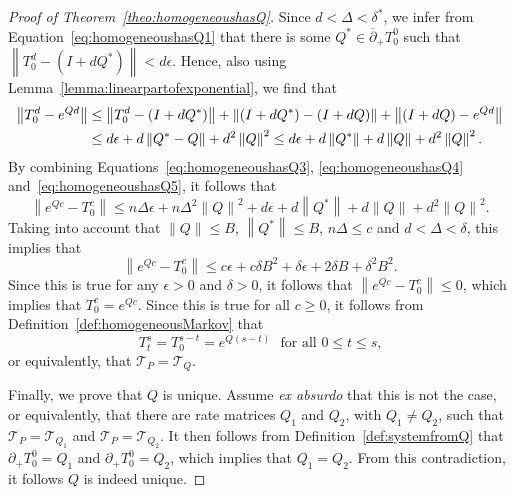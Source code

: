 \documentclass[10pt]{paper}
\theoremstyle{definition}
\newcommand{\norm}[1]{\left\lVert #1 \right\rVert}
\begin{document}
\begin{proof}[Proof of Theorem~\ref{theo:homogeneoushasQ}]
Since $d<\Delta<\delta^*$, we infer from Equation~\eqref{eq:homogeneoushasQ1} that there is some $Q^*\in\overline{\partial}_{+}
{T^0_{0}}$ such that $\norm{T_0^{d}-(I+d Q^*)}<d\epsilon$. Hence, also using Lemma~\ref{lemma:linearpartofexponential}, we find that
\begin{align}
\norm{T_0^{d}-e^{Qd}}
&\leq
\norm{T_0^{d}-(I+d Q^*)}
+
\norm{(I+d Q^*)-(I+d Q)}
+
\norm{(I+d Q)-e^{Qd}}\notag\\
&\leq
d\epsilon+d\norm{Q^*-Q}
+d^2\norm{Q}^2
\leq
d\epsilon+d\norm{Q^*}
+d\norm{Q}
+d^2\norm{Q}^2.\label{eq:homogeneoushasQ5}
\end{align}
By combining Equations~\eqref{eq:homogeneoushasQ3}, \eqref{eq:homogeneoushasQ4} and~\eqref{eq:homogeneoushasQ5}, it follows that
\begin{equation*}
\norm{
	e^{Qc}-T_0^c
}
\leq
n\Delta\epsilon
+
n\Delta^2\norm{Q}^2
+
d\epsilon
+d\norm{Q^*}
+d\norm{Q}
+d^2\norm{Q}^2.
\end{equation*}
Taking into account that $\norm{Q}\leq B$, $\norm{Q^*}\leq B$, $n\Delta\leq c$ and $d<\Delta<\delta$, this implies that
\begin{equation*}
\norm{
	e^{Qc}-T_0^c
}
\leq
c\epsilon
+
c\delta B^2
+
\delta\epsilon
+2\delta B
+\delta^2 B^2.
\end{equation*}
Since this is true for any $\epsilon>0$ and $\delta>0$, it follows that $\norm{e^{Qc}-T_0^c}\leq0$, which implies that $T_0^c=e^{Qc}$. Since this is true for all $c\geq0$, it follows from Definition~\ref{def:homogeneousMarkov} that
\begin{equation}\label{eq:homogeneoushasQ6}
T_t^s=T_0^{s-t}=e^{Q(s-t)}
\text{~~for all $0\leq t\leq s$,}
\end{equation}
or equivalently, that $\mathcal{T}_P=\mathcal{T}_Q$.

Finally, we prove that $Q$ is unique. Assume \emph{ex absurdo} that this is not the case, or equivalently, that there are rate matrices $Q_1$ and $Q_2$, with $Q_1\neq Q_2$, such that $\mathcal{T}_P=\mathcal{T}_{Q_1}$ and $\mathcal{T}_P=\mathcal{T}_{Q_2}$. It then follows from Definition~\ref{def:systemfromQ} that $\partial_{+}{T^0_{0}}=Q_1$ and $\partial_{+}{T^0_{0}}=Q_2$, which implies that $Q_1=Q_2$. From this contradiction, it follows $Q$ is indeed unique.
\end{proof}
\end{document}
